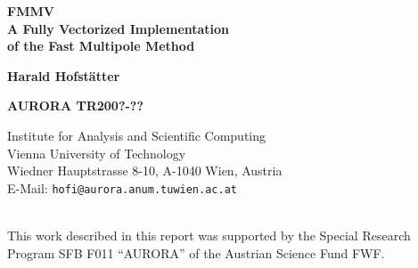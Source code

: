 \documentclass[a4paper,12pt,twoside]{report}
\begin{document}
\setcounter{tocdepth}{2}
\pagestyle{empty}

\begin{titlepage}
\renewcommand{\thefootnote}{\fnsymbol{footnote}}
\begin{center}
\vspace*{35mm} {\bf \Huge FMMV \\} 
\vspace*{13mm} {\bf \LARGE A Fully Vectorized Implementation \\of the Fast Multipole Method\\}

\vspace*{13mm} {\bf \large Harald Hofst\"{a}tter \\}

\vspace*{13mm} {\bf AURORA TR200?-??}

\vspace*{13mm}
        Institute for Analysis and Scientific Computing\\
        Vienna University of Technology\\
        Wiedner Hauptstrasse 8-10, A-1040 Wien, Austria \\
\vspace*{3mm}
        {E-Mail: \tt hofi@aurora.anum.tuwien.ac.at\\
         }
\end{center}
\vspace*{1cm}
\underline{\hspace{6cm}} \\
{\footnotesize This work described in this report was supported by
the Special Research Program SFB F011 ``AURORA'' of the Austrian
Science Fund FWF.}

\renewcommand{\thefootnote}{\arabic{footnote}}
\end{titlepage}


%


\setcounter{page}{3}

\end{document}

